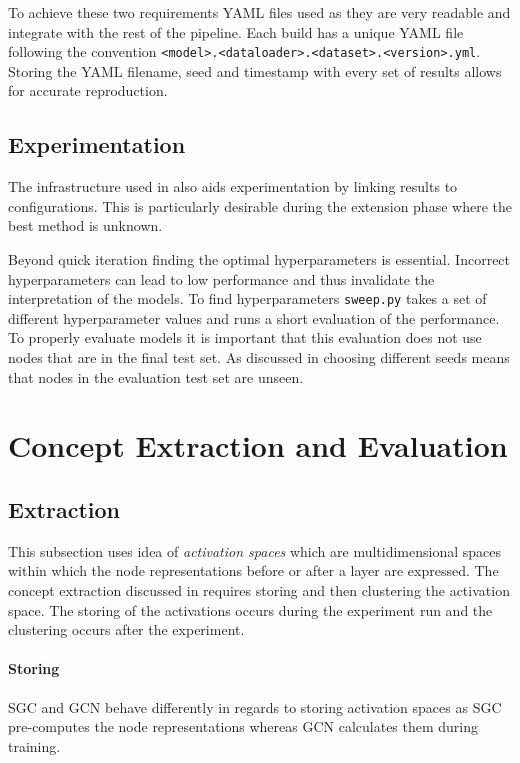 To achieve these two requirements YAML files used as they are very readable and integrate with the rest of the pipeline.
Each build has a unique YAML file following the convention \texttt{<model>.<dataloader>.<dataset>.<version>.yml}.
Storing the YAML filename, seed and timestamp with every set of results allows for accurate reproduction.

\subsection{Experimentation}
The infrastructure used in  also aids experimentation by linking results to configurations.
This is particularly desirable during the extension phase where the best method is unknown.

Beyond quick iteration finding the optimal hyperparameters is essential.
Incorrect hyperparameters can lead to low performance and thus invalidate the interpretation of the models.
To find hyperparameters \texttt{sweep.py} takes a set of different hyperparameter values and runs a short evaluation of the performance.
To properly evaluate models it is important that this evaluation does not use nodes that are in the final test set.
As discussed in  choosing different seeds means that nodes in the evaluation test set are unseen.

\section{Concept Extraction and Evaluation}
\label{sec:concepts}

\subsection{Extraction}
\label{sec:extraction}

This subsection uses idea of \emph{activation spaces} which are multidimensional spaces within which the node representations before or after a layer are expressed.
The concept extraction discussed in  requires storing and then clustering the activation space.
The storing of the activations occurs during the experiment run and the clustering occurs after the experiment.

\paragraph{Storing}
SGC and GCN behave differently in regards to storing activation spaces as SGC pre-computes the node representations whereas GCN calculates them during training.

